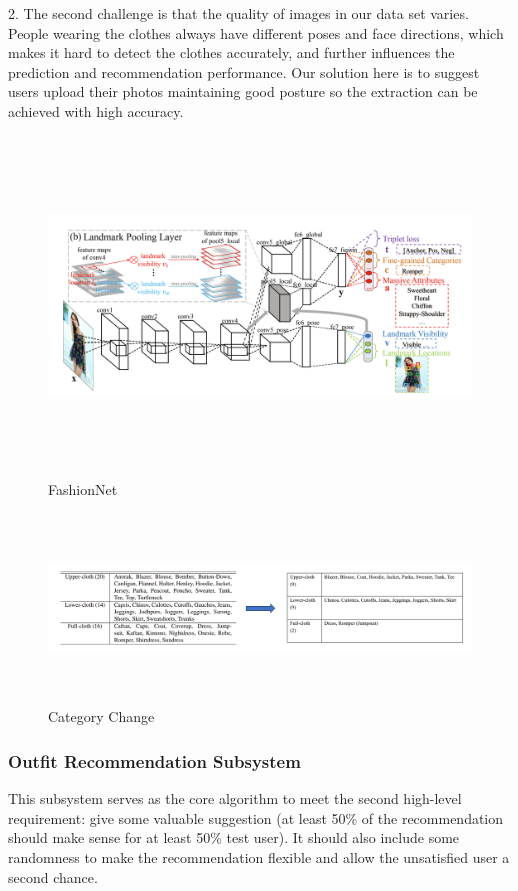 2. The second challenge is that the quality of images in our data set varies. People wearing the clothes always have different poses and face directions, which makes it hard to detect the clothes accurately, and further influences the prediction and recommendation performance. Our solution here is to suggest users upload their photos maintaining good posture so the extraction can be achieved with high accuracy.


\begin{figure}[h]
   \centering
   \includegraphics[width=14cm,height=9cm]{graph/FashionNet.png}
   \caption{FashionNet}
   \label{fashionnet}
   \end{figure}
   
\begin{figure}[h]
   \centering
   \includegraphics[width=15cm,height=5cm]{graph/category_change.png}
   \caption{Category Change}
   \label{category_change}
   \end{figure}
   
\clearpage
\subsubsection{Outfit Recommendation Subsystem}
This subsystem serves as the core algorithm to meet the second high-level requirement: give some valuable suggestion (at least 50\% of the recommendation should make sense for at least 50\% test user). It should also include some randomness to make the recommendation flexible and allow the unsatisfied user a second chance.   

